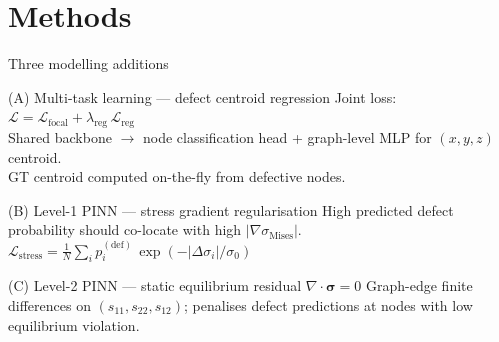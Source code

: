 \documentclass[aspectratio=169, 10pt]{beamer}
\begin{document}
\section{Methods}

\begin{frame}{Three modelling additions}
\begin{block}{(A) Multi-task learning — defect centroid regression}
Joint loss: $\mathcal{L} = \mathcal{L}_\text{focal} + \lambda_\text{reg}\,\mathcal{L}_\text{reg}$\\
Shared backbone $\to$ node classification head + graph-level MLP for $(x,y,z)$ centroid.\\
GT centroid computed on-the-fly from defective nodes.
\end{block}
\vspace{4pt}
\begin{block}{(B) Level-1 PINN — stress gradient regularisation}
High predicted defect probability should co-locate with high $|\nabla\sigma_\text{Mises}|$.\\
$\mathcal{L}_\text{stress} = \frac{1}{N}\sum_i p_i^{(\text{def})}\,\exp(-|\Delta\sigma_i|/\sigma_0)$
\end{block}
\vspace{4pt}
\begin{block}{(C) Level-2 PINN — static equilibrium residual $\nabla\!\cdot\!\boldsymbol{\sigma}=0$}
Graph-edge finite differences on $(s_{11},s_{22},s_{12})$; penalises defect predictions
at nodes with low equilibrium violation.
\end{block}
\end{frame}
\end{document}
